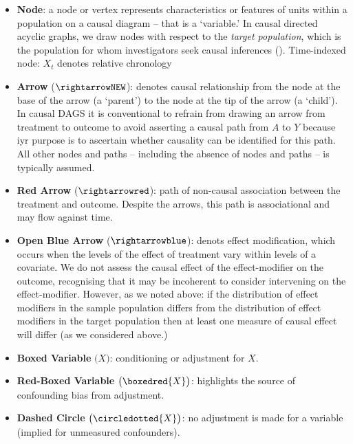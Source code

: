 \documentclass[
  single column]{article}
\begin{document}
\begin{itemize}
\item
  \textbf{Node}: a node or vertex represents characteristics or features
  of units within a population on a causal diagram -- that is a
  `variable.' In causal directed acyclic graphs, we draw nodes with
  respect to the \emph{target population}, which is the population for
  whom investigators seek causal inferences
  (). Time-indexed
  node: \(X_t\) denotes relative chronology
\item
  \textbf{Arrow} (\(\rightarrowNEW\)): denotes causal relationship from
  the node at the base of the arrow (a `parent') to the node at the tip
  of the arrow (a `child'). In causal DAGS it is conventional to refrain
  from drawing an arrow from treatment to outcome to avoid asserting a
  causal path from \(A\) to \(Y\) because iyr purpose is to ascertain
  whether causality can be identified for this path. All other nodes and
  paths -- including the absence of nodes and paths -- is typically
  assumed.
\item
  \textbf{Red Arrow} (\(\rightarrowred\)): path of non-causal
  association between the treatment and outcome. Despite the arrows,
  this path is associational and may flow against time.
\end{itemize}

\begin{itemize}
\item
  \textbf{Open Blue Arrow} (\(\rightarrowblue\)): denots effect
  modification, which occurs when the levels of the effect of treatment
  vary within levels of a covariate. We do not assess the causal effect
  of the effect-modifier on the outcome, recognising that it may be
  incoherent to consider intervening on the effect-modifier. However, as
  we noted above: if the distribution of effect modifiers in the sample
  population differs from the distribution of effect modifiers in the
  target population then at least one measure of causal effect will
  differ (as we considered above.)
\item
  \textbf{Boxed Variable} \(\big(\boxed{X}\big)\): conditioning or
  adjustment for \(X\).
\item
  \textbf{Red-Boxed Variable} \(\big(\boxedred{X}\big)\): highlights the
  source of confounding bias from adjustment.
\item
  \textbf{Dashed Circle} \(\big( \circledotted{X}\big)\): no adjustment
  is made for a variable (implied for unmeasured confounders).
\end{itemize}
\end{document}
